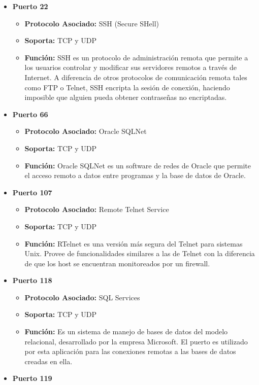 \documentclass[a4paper,12pt]{article}
\begin{document}
\begin{itemize}
 \item \textbf{Puerto 22}
 \begin{itemize}
  \item \textbf{Protocolo Asociado:}  SSH (Secure SHell)
  \item \textbf{Soporta:} TCP y UDP
  \item \textbf{Función:} SSH es un protocolo de administración remota que permite a los usuarios controlar y modificar sus servidores remotos a través de Internet.
  A diferencia de otros protocolos de comunicación remota tales como FTP o Telnet, SSH encripta la sesión de conexión, haciendo imposible que alguien pueda obtener contraseñas no encriptadas.
 \end{itemize}
 \item \textbf{Puerto 66}
 \begin{itemize}
  \item \textbf{Protocolo Asociado:} Oracle SQLNet
  \item \textbf{Soporta:} TCP y UDP
  \item \textbf{Función:} Oracle SQLNet es un software de redes de Oracle que permite el acceso remoto a datos entre programas y la base de datos de Oracle.
 \end{itemize}
 \item \textbf{Puerto 107}
 \begin{itemize}
  \item \textbf{Protocolo Asociado:} Remote Telnet Service
  \item \textbf{Soporta:} TCP y UDP
  \item \textbf{Función:} RTelnet es una versión más segura del Telnet para sistemas Unix. Provee de funcionalidades similares a las de Telnet con la diferencia
  de que los host se encuentran monitoreados por un firewall.
 \end{itemize}
 \item \textbf{Puerto 118}
 \begin{itemize}
  \item \textbf{Protocolo Asociado:} SQL Services
  \item \textbf{Soporta:} TCP y UDP
  \item \textbf{Función:} Es un sistema de manejo de bases de datos del modelo relacional, desarrollado por la empresa Microsoft. El puerto es utilizado por esta aplicación
  para las conexiones remotas a las bases de datos creadas en ella.
 \end{itemize}
 \item \textbf{Puerto 119}

\end{itemize}
\end{document}
